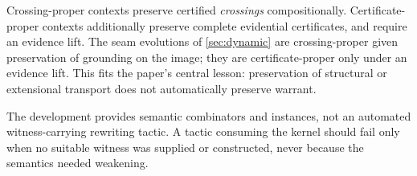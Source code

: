 \begin{rem}\label{rem:crossinglevel}
Crossing-proper contexts preserve certified \emph{crossings} compositionally. Certificate-proper contexts additionally preserve complete evidential certificates, and require an evidence lift. The seam evolutions of \cref{sec:dynamic} are crossing-proper given preservation of grounding on the image; they are certificate-proper only under an evidence lift. This fits the paper's central lesson: preservation of structural or extensional transport does not automatically preserve warrant.
\end{rem}
The development provides semantic combinators and instances, not an automated witness-carrying rewriting tactic. A tactic consuming the kernel should fail only when no suitable witness was supplied or constructed, never because the semantics needed weakening.
